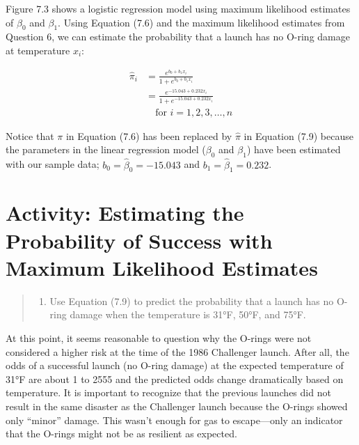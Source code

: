 \documentclass[
]{report}
\providecommand{\tightlist}{%
  \setlength{\itemsep}{0pt}\setlength{\parskip}{0pt}}
\begin{document}
Figure 7.3 shows a logistic regression model using maximum likelihood estimates of \(\beta_0\) and \(\beta_1\). Using Equation (7.6) and the maximum likelihood estimates from Question 6, we can estimate the probability that a launch has no O-ring damage at temperature \(x_i\):

\begin{align}
\hat\pi_i 
&= \frac{e^{b_0 + b_1 x_i}}{1 + e^{b_0 + b_1 x_i}} \\
&= \frac{e^{-15.043 + 0.232 x_i}}{1 + e^{-15.043 + 0.232 x_i}} \\
&\quad \text{for } i = 1,2,3,\dots,n \tag{7.9}
\end{align}

Notice that \(\pi\) in Equation (7.6) has been replaced by \(\hat\pi\) in Equation (7.9) because the parameters in the linear regression model (\(\beta_0\) and \(\beta_1\)) have been estimated with our sample data; \(b_0 = \hat\beta_0 = -15.043\) and \(b_1 = \hat\beta_1 = 0.232\).

\hypertarget{activity-estimating-the-probability-of-success-with-maximum-likelihood-estimates-1}{%
\section*{Activity: Estimating the Probability of Success with Maximum Likelihood Estimates}\label{activity-estimating-the-probability-of-success-with-maximum-likelihood-estimates-1}}

\begin{quote}
\begin{enumerate}
\def\labelenumi{\arabic{enumi}.}
\setcounter{enumi}{6}
\tightlist
\item
  Use Equation (7.9) to predict the probability that a launch has no O-ring damage when the temperature is 31°F, 50°F, and 75°F.
\end{enumerate}
\end{quote}

At this point, it seems reasonable to question why the O-rings were not considered a higher risk at the time of the 1986 Challenger launch. After all, the odds of a successful launch (no O-ring damage) at the expected temperature of 31°F are about 1 to 2555 and the predicted odds change dramatically based on temperature. It is important to recognize that the previous launches did not result in the same disaster as the Challenger launch because the O-rings showed only ``minor'' damage. This wasn't enough for gas to escape---only an indicator that the O-rings might not be as resilient as expected.
\end{document}
